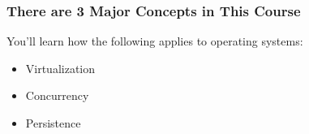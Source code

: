   \begin{frame}
    \frametitle{There are 3 Major Concepts in This Course}

    You'll learn how the following applies to operating systems:
    \begin{itemize}
      \item Virtualization
      \item Concurrency
      \item Persistence
    \end{itemize}
  \end{frame}

